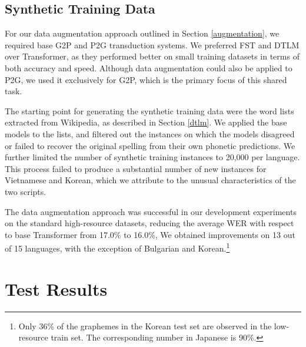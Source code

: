 \documentclass[11pt,a4paper]{article}
\newcommand{\transformer}{{\sc Transformer}}
\begin{document}
\subsection{Synthetic Training Data}
\label{synthetic}


For our data augmentation approach
outlined in Section \ref{augmentation},
we required base G2P and P2G transduction systems.
We preferred FST and DTLM over {\transformer},
as they performed better on small training datasets
in terms of both accuracy and speed.
Although %
data augmentation could also be applied to P2G,
we used it exclusively for G2P, 
which is the primary focus of this shared task.




The starting point for generating the synthetic training data
were the word lists extracted from Wikipedia,
as described in Section \ref{dtlm}.
We applied the base models to the lists,
and filtered out the instances on which the models disagreed
or failed to recover the original spelling from their own phonetic predictions.
We further limited the number of synthetic training instances to
20,000 per language.
This process failed to produce a substantial number of new instances
for Vietnamese and Korean,
which we attribute to the unusual characteristics of the two scripts.


The data augmentation approach
was successful in our development experiments
on the standard high-resource datasets,
reducing the average WER with respect to base {\transformer}
from 17.0\% to 16.0\%,
We obtained improvements on 13 out of 15 languages,
with the exception of 
Bulgarian and Korean.\footnote{Only 36\% of the graphemes 
in the Korean test set are observed in the low-resource train set.
The corresponding number in Japanese is 90\%.}


\section{Test Results}
\label{results}
\end{document}
